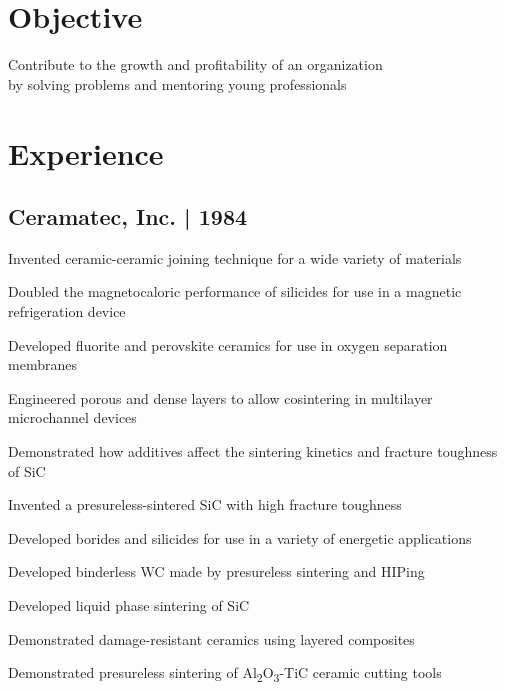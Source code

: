 \documentclass[letterpaper]{deedy-resume} %
\begin{document}
\begin{minipage}[t]{0.62\textwidth} %


\section{Objective}

Contribute to the growth and profitability of an organization \\ by
  solving problems and mentoring young professionals

\sectionspace

\section{Experience}

\subsection{Ceramatec, Inc. | 1984}

\begin{tightitemize}
  \vspace{\topsep} %
  \item
    Invented ceramic-ceramic joining technique for a wide variety of materials
  \item
    Doubled the magnetocaloric performance of silicides for use in a magnetic refrigeration device
  \item
    Developed fluorite and perovskite ceramics for use in oxygen separation membranes
  \item
    Engineered porous and dense layers to allow cosintering in multilayer microchannel devices
  \item
    Demonstrated how additives affect the sintering kinetics and fracture toughness of SiC
  \item
    Invented a presureless-sintered SiC with high fracture toughness
  \item
    Developed borides and silicides for use in a variety of energetic applications
  \item
    Developed binderless WC made by presureless sintering and HIPing
  \item
    Developed liquid phase sintering of SiC
  \item
    Demonstrated damage-resistant ceramics using layered composites
  \item
    Demonstrated presureless sintering of Al\textsubscript{2}O\textsubscript{3}-TiC ceramic cutting tools
\end{tightitemize}


\end{minipage}
\end{document}
